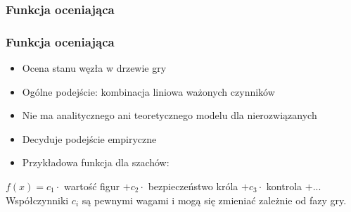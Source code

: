 \documentclass[polish,envcountsect,10pt]{beamer}
\begin{document}
                \subsubsection{Funkcja oceniająca}
                \begin{frame}
                    \frametitle{Funkcja oceniająca}
                    \begin{itemize}
                        \item<1-> Ocena stanu węzła w drzewie gry
                        \item<2-> Ogólne podejście: kombinacja liniowa ważonych czynników
                        \item<3-> Nie ma analitycznego ani teoretycznego modelu dla nierozwiązanych
                        \item<4-> Decyduje podejście empiryczne
                        \item<5-> Przykładowa funkcja dla szachów:
                    \end{itemize}
                    $f(x) = c_1 \cdot$ wartość figur \pause $+ c_2 \cdot$ bezpieczeństwo króla \pause $+ c_3 \cdot$ kontrola \pause $+ ...$ \pause
                    Współczynniki $c_i$ są pewnymi wagami i mogą się zmieniać zależnie od fazy gry.
                \end{frame}
\end{document}
